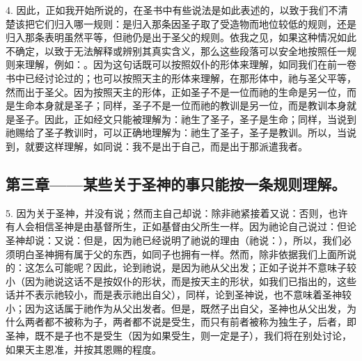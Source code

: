 4. 因此，正如我开始所说的，在圣书中有些说法是如此表述的，以致于我们不清楚该把它们归入哪一规则：是归入那条因圣子取了受造物而地位较低的规则，还是归入那条表明虽然平等，但祂仍是出于圣父的规则。依我之见，如果这种情况如此不确定，以致于无法解释或辨别其真实含义，那么这些段落可以安全地按照任一规则来理解，例如：。因为这句话既可以按照奴仆的形体来理解，如同我们在前一卷书中已经讨论过的；也可以按照天主的形体来理解，在那形体中，祂与圣父平等，然而出于圣父。因为按照天主的形体，正如圣子不是一位而祂的生命是另一位，而是生命本身就是圣子；同样，圣子不是一位而祂的教训是另一位，而是教训本身就是圣子。因此，正如经文只能被理解为：祂生了圣子，圣子是生命；同样，当说到祂赐给了圣子教训时，可以正确地理解为：祂生了圣子，圣子是教训。所以，当说到，就要这样理解，如同说：我不是出于自己，而是出于那派遣我者。\par


\subsection{第三章——某些关于圣神的事只能按一条规则理解。}

5. 因为关于圣神，并没有说；然而主自己却说：除非祂紧接着又说：否则，也许有人会相信圣神是由基督所生，正如基督由父所生一样。因为祂论自己说过：但论圣神却说：又说：但是，因为祂已经说明了祂说的理由（祂说：），所以，我们必须明白圣神拥有属于父的东西，如同子也拥有一样。然而，除非依据我们上面所说的：这怎么可能呢？因此，论到祂说，是因为祂从父出发；正如子说并不意味子较小（因为祂说这话不是按奴仆的形状，而是按天主的形状，如我们已指出的，这些话并不表示祂较小，而是表示祂出自父），同样，论到圣神说，也不意味着圣神较小；因为这话属于祂作为从父出发者。但是，既然子出自父，圣神也从父出发，为什么两者都不被称为子，两者都不说是受生，而只有前者被称为独生子，后者，即圣神，既不是子也不是受生（因为如果受生，则一定是子），我们将在别处讨论，如果天主恩准，并按其恩赐的程度。\par

